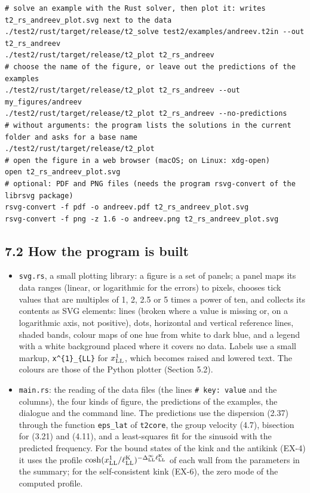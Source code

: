 \documentclass[
  10pt,
]{article}
\providecommand{\tightlist}{%
  \setlength{\itemsep}{0pt}\setlength{\parskip}{0pt}}
\begin{document}
\begin{verbatim}
# solve an example with the Rust solver, then plot it: writes t2_rs_andreev_plot.svg next to the data
./test2/rust/target/release/t2_solve test2/examples/andreev.t2in --out t2_rs_andreev
./test2/rust/target/release/t2_plot t2_rs_andreev
# choose the name of the figure, or leave out the predictions of the examples
./test2/rust/target/release/t2_plot t2_rs_andreev --out my_figures/andreev
./test2/rust/target/release/t2_plot t2_rs_andreev --no-predictions
# without arguments: the program lists the solutions in the current folder and asks for a base name
./test2/rust/target/release/t2_plot
# open the figure in a web browser (macOS; on Linux: xdg-open)
open t2_rs_andreev_plot.svg
# optional: PDF and PNG files (needs the program rsvg-convert of the librsvg package)
rsvg-convert -f pdf -o andreev.pdf t2_rs_andreev_plot.svg
rsvg-convert -f png -z 1.6 -o andreev.png t2_rs_andreev_plot.svg
\end{verbatim}

\hypertarget{how-the-program-is-built-1}{%
\subsection{7.2 How the program is
built}\label{how-the-program-is-built-1}}

\begin{itemize}
\tightlist
\item
  \texttt{svg.rs}, a small plotting library: a figure is a set of
  panels; a panel maps its data ranges (linear, or logarithmic for the
  errors) to pixels, chooses tick values that are multiples of 1, 2, 2.5
  or 5 times a power of ten, and collects its contents as SVG elements:
  lines (broken where a value is missing or, on a logarithmic axis, not
  positive), dots, horizontal and vertical reference lines, shaded
  bands, colour maps of one hue from white to dark blue, and a legend
  with a white background placed where it covers no data. Labels use a
  small markup, \texttt{x\^{}\{1\}\_\{LL\}} for \(x^1_{\rm LL}\), which
  becomes raised and lowered text. The colours are those of the Python
  plotter (Section 5.2).
\item
  \texttt{main.rs}: the reading of the data files (the lines
  \texttt{\#\ key:\ value} and the columns), the four kinds of figure,
  the predictions of the examples, the dialogue and the command line.
  The predictions use the dispersion (2.37) through the function
  \texttt{eps\_lat} of \texttt{t2core}, the group velocity (4.7),
  bisection for (3.21) and (4.11), and a least-squares fit for the
  sinusoid with the predicted frequency. For the bound states of the
  kink and the antikink (EX-4) it uses the profile
  \(\cosh(x^1_{\rm LL}/\ell^{\rm K}_{\rm LL})^{-\Delta^\infty_{\rm LL}\ell^{\rm K}_{\rm LL}}\)
  of each wall from the parameters in the summary; for the
  self-consistent kink (EX-6), the zero mode of the computed profile.
\end{itemize}
\end{document}
